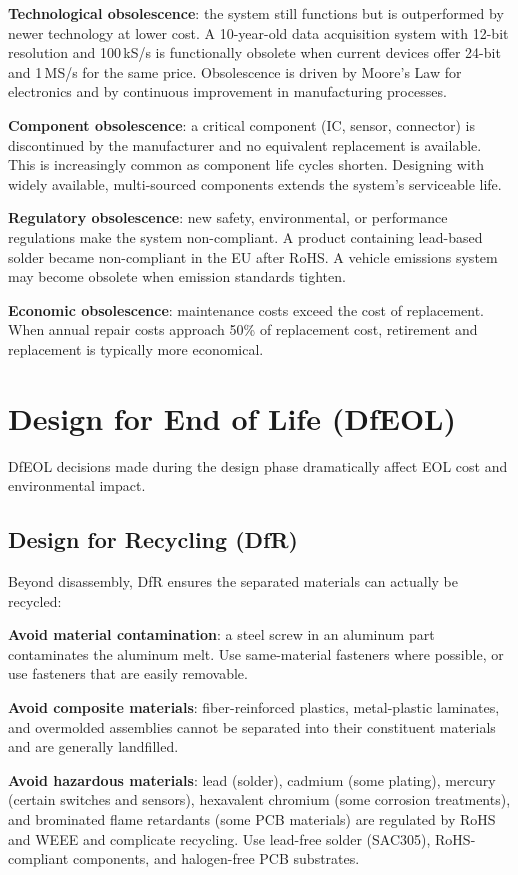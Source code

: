 \documentclass[11pt,letterpaper,twoside,openany]{book}
\begin{document}
\textbf{Technological obsolescence}: the system still functions but is outperformed by newer technology at lower cost. A 10-year-old data acquisition system with 12-bit resolution and 100\,kS/s is functionally obsolete when current devices offer 24-bit and 1\,MS/s for the same price. Obsolescence is driven by Moore's Law for electronics and by continuous improvement in manufacturing processes.

\textbf{Component obsolescence}: a critical component (IC, sensor, connector) is discontinued by the manufacturer and no equivalent replacement is available. This is increasingly common as component life cycles shorten. Designing with widely available, multi-sourced components extends the system's serviceable life.

\textbf{Regulatory obsolescence}: new safety, environmental, or performance regulations make the system non-compliant. A product containing lead-based solder became non-compliant in the EU after RoHS. A vehicle emissions system may become obsolete when emission standards tighten.

\textbf{Economic obsolescence}: maintenance costs exceed the cost of replacement. When annual repair costs approach 50\% of replacement cost, retirement and replacement is typically more economical.

\section{Design for End of Life (DfEOL)}
DfEOL decisions made during the design phase dramatically affect EOL cost and environmental impact.

\subsection{Design for Recycling (DfR)}
Beyond disassembly, DfR ensures the separated materials can actually be recycled:

\textbf{Avoid material contamination}: a steel screw in an aluminum part contaminates the aluminum melt. Use same-material fasteners where possible, or use fasteners that are easily removable.

\textbf{Avoid composite materials}: fiber-reinforced plastics, metal-plastic laminates, and overmolded assemblies cannot be separated into their constituent materials and are generally landfilled.

\textbf{Avoid hazardous materials}: lead (solder), cadmium (some plating), mercury (certain switches and sensors), hexavalent chromium (some corrosion treatments), and brominated flame retardants (some PCB materials) are regulated by RoHS and WEEE and complicate recycling. Use lead-free solder (SAC305), RoHS-compliant components, and halogen-free PCB substrates.
\end{document}
